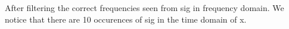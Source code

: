 \documentclass{article}
\begin{document}
\begin{center}
\end{center}
\begin{center}
\end{center}
After filtering the correct frequencies seen from sig in frequency domain. We notice that there are 10 occurences of sig in the time domain of x.
\clearpage
\end{document}
